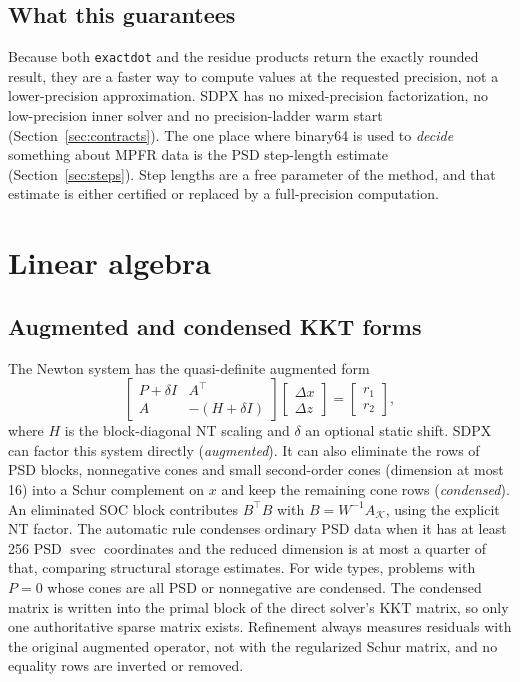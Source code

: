 \documentclass[11pt]{article}
\newcommand{\K}{\mathcal{K}}
\newcommand{\svec}{\operatorname{svec}}
\newcommand{\code}[1]{\texttt{#1}}
\begin{document}
\subsection{What this guarantees}

Because both \code{exactdot} and the residue products return the exactly
rounded result, they are a faster way to compute values at the requested
precision, not a lower-precision approximation. SDPX has no mixed-precision
factorization, no low-precision inner solver and no precision-ladder warm
start (Section~\ref{sec:contracts}). The one place where binary64 is used to
\emph{decide} something about MPFR data is the PSD step-length estimate
(Section~\ref{sec:steps}). Step lengths are a free parameter of the method,
and that estimate is either certified or replaced by a full-precision
computation.

\section{Linear algebra}
\label{sec:linalg}

\subsection{Augmented and condensed KKT forms}

The Newton system has the quasi-definite augmented form
\begin{equation}
  \begin{bmatrix} P + \delta I & A^\top \\ A & -(H + \delta I) \end{bmatrix}
  \begin{bmatrix} \Delta x \\ \Delta z \end{bmatrix} = \begin{bmatrix} r_1 \\ r_2 \end{bmatrix},
\end{equation}
where $H$ is the block-diagonal NT scaling and $\delta$ an optional static
shift. SDPX can factor this system directly (\emph{augmented}). It can also
eliminate the rows of PSD blocks, nonnegative cones and small second-order
cones (dimension at most 16) into a Schur complement on $x$ and keep the
remaining cone rows (\emph{condensed}). An eliminated SOC block contributes
$B^\top B$ with $B=W^{-1}A_\K$, using the explicit NT factor. The automatic
rule condenses ordinary PSD data when it has at least 256 PSD $\svec$
coordinates and the reduced dimension is at most a quarter of that, comparing
structural storage estimates. For wide types, problems with $P=0$ whose cones
are all PSD or nonnegative are condensed.
The condensed matrix is written into the primal block of the direct solver's
KKT matrix, so only one authoritative sparse matrix exists. Refinement
always measures residuals with the original augmented operator, not with the
regularized Schur matrix, and no equality rows are inverted or removed.
\end{document}
